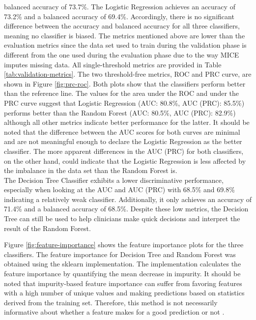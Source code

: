 balanced accuracy of 73.7\%. The Logistic Regression achieves an accuracy of 
73.2\% and a balanced accuracy of 69.4\%. Accordingly, there is 
no significant difference between the accuracy and balanced accuracy for 
all three classifiers, meaning no classifier is biased.
The metrics mentioned above are lower than the evaluation metrics since the 
data 
set used to train during the validation phase is different from the one used 
during the evaluation phase due to the way MICE imputes missing data.
All single-threshold metrics are provided in Table \ref{tab:validation-metrics}.
The two threshold-free metrics, ROC and PRC curve, are shown in Figure 
\ref{fig:prc-roc}. Both plots show that the classifiers perform better than the 
reference line. The values for the area under the ROC and under the PRC curve 
suggest that Logistic Regression (AUC: 80.8\%, AUC (PRC): 85.5\%) performs 
better than the Random Forest (AUC: 80.5\%, AUC (PRC): 82.9\%) although all 
other metrics indicate better performance for the latter. It 
should be noted that the difference between the AUC scores for both curves are 
minimal and are not meaningful enough to declare the Logistic Regression as the 
better classifier. The more apparent differences in the AUC (PRC) for both 
classifiers, on the other hand, could indicate that the Logistic Regression is 
less affected by the imbalance in the data set than the Random Forest is.
\\
The Decision Tree Classifier exhibits a lower discriminative performance,
especially when looking at the AUC and AUC (PRC) with 68.5\% and 69.8\% 
indicating a relatively weak classifier. Additionally, it only 
achieves an accuracy of 71.4\% and a balanced accuracy of 68.5\%. Despite 
these low metrics, the Decision Tree can still be used to 
help clinicians make quick decisions and interpret the result of the Random 
Forest.
\par
Figure \ref{fig:feature-importance} shows the feature importance plots for the 
three classifiers. The feature importance for Decision Tree and Random Forest 
was obtained using the sklearn implementation. The implementation calculates 
the feature importance by quantifying the mean decrease in impurity. 
It should be noted that impurity-based feature importance can suffer 
from favoring features with a high number of unique values and making 
predictions based on statistics derived from the training set. Therefore, this 
method is not necessarily informative about whether a feature makes for a 
good prediction or not \cite{RN178}.
